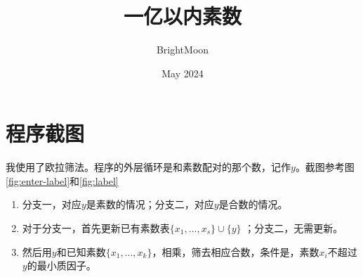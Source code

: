 \documentclass[UTF8]{ctexart}
\title{一亿以内素数}
\author{BrightMoon}
\date{May 2024}
\begin{document}
\maketitle

\section{程序截图}
我使用了欧拉筛法。程序的外层循环是和素数配对的那个数，记作$y$。截图参考图\ref{fig:enter-label}和\ref{fig:label}
\begin{enumerate}
\item 分支一，对应$y$是素数的情况；分支二，对应$y$是合数的情况。
\item 对于分支一，首先更新已有素数表$\{ x_1,...,x_s\}\cup \{y\}$ ；分支二，无需更新。
\item 然后用$y$和已知素数$\{x_1,...,x_k\}$，相乘，筛去相应合数，条件是，素数$x_i$不超过$y$的最小质因子。

\end{enumerate}
\end{document}
